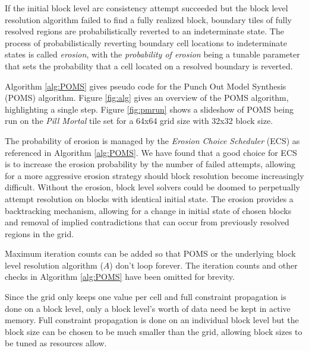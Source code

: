 If the initial block level arc consistency attempt succeeded but the block level resolution
algorithm failed to find a fully realized block,
boundary tiles of fully resolved regions are probabilistically reverted to an indeterminate state.
The process of probabilistically reverting boundary cell locations to indeterminate states is called \textit{erosion},
with the \textit{probability of erosion} being a tunable parameter that sets the probability that a cell located on a resolved boundary
is reverted.

Algorithm \ref{alg:POMS} gives pseudo code for the Punch Out Model Synthesis (POMS) algorithm.
Figure \ref{fig:alg} gives an overview of the POMS algorithm, highlighting
a single step.
Figure \ref{fig:pmrun} shows a slideshow of POMS being run on the \textit{Pill Mortal}
tile set for a 64x64 grid size with 32x32 block size.

The probability of erosion is managed by the \textit{Erosion Choice Scheduler} (ECS) as referenced in Algorithm \ref{alg:POMS}.
We have found that a good choice for ECS is to increase the erosion probability by the number of failed attempts, allowing
for a more aggressive erosion strategy should block resolution become increasingly difficult.
Without the erosion, block level solvers could be doomed
to perpetually attempt resolution on blocks with identical initial state.
The erosion provides a backtracking mechanism, allowing for a change in initial state
of chosen blocks and removal of implied contradictions that can occur from previously resolved regions in the grid.

Maximum iteration counts can be added so that POMS or the underlying block level resolution
algorithm ($A$) don't loop forever.
The iteration counts and other checks in Algorithm \ref{alg:POMS} have been omitted for brevity.


Since the grid only keeps one value per cell and full constraint propagation is done
on a block level, only a block level's worth of data need be kept in active memory.
Full constraint propagation is done on an individual block level but the block size can be
chosen to be much smaller than the grid, allowing block sizes to be tuned as resources allow.

